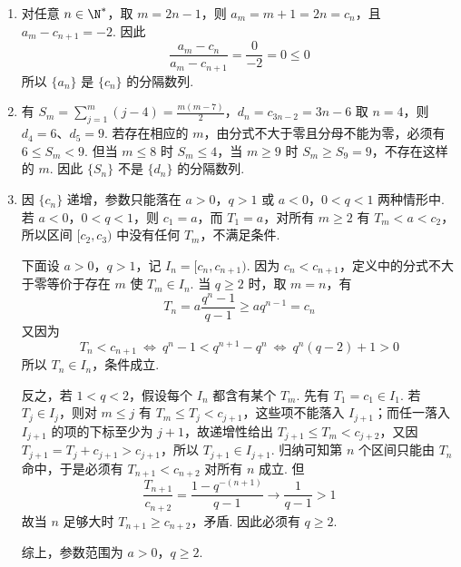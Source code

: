 \begin{solution}
\begin{enumerate}
\item 对任意 \(n\in\N^*\)，取 \(m=2n-1\)，则 \(a_m=m+1=2n=c_n\)，且 \(a_m-c_{n+1}=-2\). 因此
\[
\frac{a_m-c_n}{a_m-c_{n+1}}=\frac0{-2}=0\le0
\]
所以 \(\{a_n\}\) 是 \(\{c_n\}\) 的分隔数列.
\item 有
\(S_m=\sum_{j=1}^{m}(j-4)=\frac{m(m-7)}2\)，\(d_n=c_{3n-2}=3n-6\)
取 \(n=4\)，则 \(d_4=6\)、\(d_5=9\). 若存在相应的 \(m\)，由分式不大于零且分母不能为零，必须有 \(6\le S_m<9\). 但当 \(m\le8\) 时 \(S_m\le4\)，当 \(m\ge9\) 时 \(S_m\ge S_9=9\)，不存在这样的 \(m\). 因此 \(\{S_n\}\) 不是 \(\{d_n\}\) 的分隔数列.
\item 因 \(\{c_n\}\) 递增，参数只能落在 \(a>0\)，\(q>1\) 或 \(a<0\)，\(0<q<1\) 两种情形中. 若 \(a<0\)，\(0<q<1\)，则 \(c_1=a\)，而 \(T_1=a\)，对所有 \(m\ge2\) 有 \(T_m<a<c_2\)，所以区间 \([c_2,c_3)\) 中没有任何 \(T_m\)，不满足条件.

下面设 \(a>0\)，\(q>1\)，记 \(I_n=[c_n,c_{n+1})\). 因为 \(c_n<c_{n+1}\)，定义中的分式不大于零等价于存在 \(m\) 使 \(T_m\in I_n\). 当 \(q\ge2\) 时，取 \(m=n\)，有
\[
T_n=a\frac{q^n-1}{q-1}\ge aq^{n-1}=c_n
\]
又因为
\[
T_n<c_{n+1}\ \Longleftrightarrow\ q^n-1<q^{n+1}-q^n\ \Longleftrightarrow\ q^n(q-2)+1>0
\]
所以 \(T_n\in I_n\)，条件成立.

反之，若 \(1<q<2\)，假设每个 \(I_n\) 都含有某个 \(T_m\). 先有 \(T_1=c_1\in I_1\). 若 \(T_j\in I_j\)，则对 \(m\le j\) 有 \(T_m\le T_j<c_{j+1}\)，这些项不能落入 \(I_{j+1}\)；而任一落入 \(I_{j+1}\) 的项的下标至少为 \(j+1\)，故递增性给出 \(T_{j+1}\le T_m<c_{j+2}\)，又因 \(T_{j+1}=T_j+c_{j+1}>c_{j+1}\)，所以 \(T_{j+1}\in I_{j+1}\). 归纳可知第 \(n\) 个区间只能由 \(T_n\) 命中，于是必须有 \(T_{n+1}<c_{n+2}\) 对所有 \(n\) 成立. 但
\[
\frac{T_{n+1}}{c_{n+2}}=\frac{1-q^{-(n+1)}}{q-1}\longrightarrow\frac1{q-1}>1
\]
故当 \(n\) 足够大时 \(T_{n+1}\ge c_{n+2}\)，矛盾. 因此必须有 \(q\ge2\).

综上，参数范围为 \(a>0\)，\(q\ge2\).
\end{enumerate}
\end{solution}
